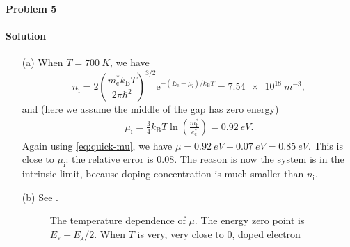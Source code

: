 \documentclass[hyperref, a4paper]{article}
\newcommand*{\ee}{\mathrm{e}}
\begin{document}
\paragraph{Problem 5}

\paragraph{Solution} \begin{itemize}
\item[(a)] When $T = \SI{700}{K}$, we have 
\begin{equation}
    n_{\text{i}} = 2 \left( \frac{m_\text{e}^* k_{\text{B}} T}{2 \pi \hbar^2} \right)^{3/2} 
    \ee^{- (E_{\text{c}} - \mu_{\text{i}}) / k_{\text{B}} T} 
    = \SI{7.54e18}{m^{-3}},
\end{equation}
and (here we assume the middle of the gap has zero energy)
\begin{eqnarray}
    \mu_{\text{i}} = \frac{3}{4} k_{\text{B}} T \ln(\frac{m^*_{\text{h}} }{e^*_{\text{e}}}) = \SI{0.92}{eV}.
\end{eqnarray}
Again using \eqref{eq:quick-mu}, we have $\mu = \SI{0.92}{eV} - \SI{0.07}{eV} = \SI{0.85}{eV}$.
This is close to $\mu_{\text{i}}$: the relative error is 0.08.
The reason is now the system is in the intrinsic limit, 
because doping concentration is much smaller than $n_{\text{i}}$.

\item[(b)] See .

\begin{figure}
    \centering
    
    \caption{The temperature dependence of $\mu$. 
    The energy zero point is $E_{\text{v}} + E_{\text{g}} / 2$.
    When $T$ is very, very close to 0, doped electron }
    \label{fig:semiconductor-limits}
\end{figure}

\end{itemize}
\end{document}
